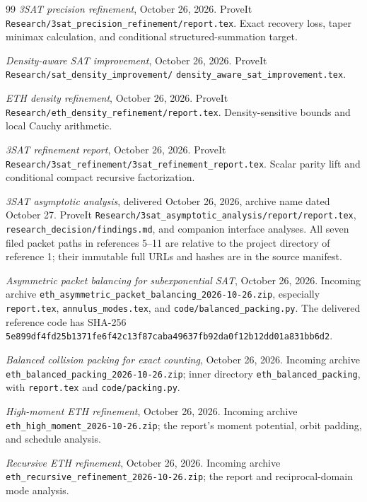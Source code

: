\begin{thebibliography}{99}
 \emph{3SAT precision refinement}, October 26, 2026.
ProveIt \nolinkurl{Research/3sat_precision_refinement/report.tex}.
Exact recovery loss, taper minimax calculation, and conditional
structured-summation target.

 \emph{Density-aware SAT improvement}, October 26, 2026.
ProveIt \nolinkurl{Research/sat_density_improvement/}
\nolinkurl{density_aware_sat_improvement.tex}.

 \emph{ETH density refinement}, October 26, 2026.
ProveIt \nolinkurl{Research/eth_density_refinement/report.tex}.
Density-sensitive bounds and local Cauchy arithmetic.

 \emph{3SAT refinement report}, October 26, 2026.
ProveIt \nolinkurl{Research/3sat_refinement/3sat_refinement_report.tex}.
Scalar parity lift and conditional compact recursive factorization.

 \emph{3SAT asymptotic analysis}, delivered October 26,
2026, archive name dated October 27. ProveIt
\nolinkurl{Research/3sat_asymptotic_analysis/report/report.tex},
\nolinkurl{research_decision/findings.md}, and companion interface analyses.
All seven filed packet paths in references 5--11 are relative to the
project directory of reference 1; their immutable full URLs and hashes
are in the source manifest.

 \emph{Asymmetric packet balancing for subexponential
SAT}, October 26, 2026. Incoming archive
\nolinkurl{eth_asymmetric_packet_balancing_2026-10-26.zip}, especially
\nolinkurl{report.tex}, \nolinkurl{annulus_modes.tex}, and
\nolinkurl{code/balanced_packing.py}. The delivered reference code has
SHA-256 \nolinkurl{5e899df4fd25b1371fe6f42c13f87caba49637fb92da0f12b12dd01a831bb6d2}.

 \emph{Balanced collision packing for exact counting},
October 26, 2026. Incoming archive
\nolinkurl{eth_balanced_packing_2026-10-26.zip}; inner directory
\nolinkurl{eth_balanced_packing}, with \nolinkurl{report.tex} and
\nolinkurl{code/packing.py}.

 \emph{High-moment ETH refinement}, October 26, 2026.
Incoming archive \nolinkurl{eth_high_moment_2026-10-26.zip}; the report's
moment potential, orbit padding, and schedule analysis.

 \emph{Recursive ETH refinement}, October 26, 2026.
Incoming archive \nolinkurl{eth_recursive_refinement_2026-10-26.zip};
the report and reciprocal-domain mode analysis.


\end{thebibliography}
